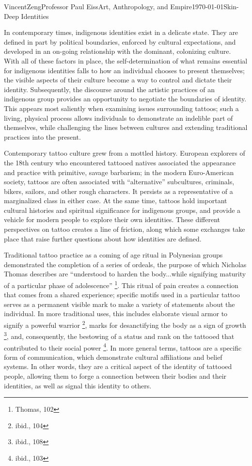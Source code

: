 \documentclass[12pt]{article}
\begin{document}
\begin{mla}{Vincent}{Zeng}{Professor Paul Eiss}{Art, Anthropology, and
  Empire}{\today}{Skin-Deep Identities}

In contemporary times, indigenous identities exist in a delicate state.
They are defined in part by political boundaries, enforced by cultural
expectations, and developed in an on-going relationship with the dominant,
colonizing culture. With all of these factors in place, the self-determination
of what remains essential for indigenous identities falls to how an individual
chooses to present themselves; the visible aspects of their culture become a way
to control and dictate their identity. Subsequently, the discourse around
the artistic practices of an indigenous group provides an
opportunity to negotiate the boundaries of identity. This appears most
saliently when examining issues surrounding tattoos; such a living, physical
process allows individuals to demonstrate an indelible part of themselves, while
challenging the lines between cultures and extending traditional practices into
the present.

Contemporary tattoo culture grew from a mottled history. European explorers of the
18th century who encountered tattooed natives associated the appearance and
practice with primitive, savage barbarism; in the modern
Euro-American society, tattoos are often associated with ``alternative''
subcultures, criminals, bikers, sailors, and other rough characters. It persists
as a representative of a marginalized class in either case. At the same time,
tattoos hold important cultural histories and spiritual significance for
indigenous groups, and provide a vehicle for modern people to explore their own
identities. These different perspectives on tattoo creates a line of friction,
along which some exchanges take place that raise further questions about how
identities are defined.

Traditional tattoo practice as a coming of age ritual in Polynesian groups
demonstrated the
completion of a series of ordeals, the purpose of which Nicholas Thomas
describes are ``understood to harden the body...while signifying maturity of a
particular phase of adolescence'' \footnote{Thomas, 102}. This ritual of
pain creates a connection that comes from a shared experience; specific motifs
used in a particular tattoo serves as a permanent visible mark to make a variety
of statements about the individual. In more traditional uses, this includes
elaborate visual armor to signify a powerful warrior \footnote{ibid., 104},
marks for desanctifying the body as a sign of growth \footnote{ibid., 108}, and,
consequently, the bestowing of a status and rank on the tattooed that
contributed to their social power \footnote{ibid., 103}. In more general terms,
tattoos are a specific form of communication, which demonstrate cultural
affiliations and belief systems. In other words, they are a critical aspect of
the identity of tattooed people, allowing them to forge a connection
between their bodies and their identities, as well as signal this identity to
others.


\end{mla}
\end{document}
